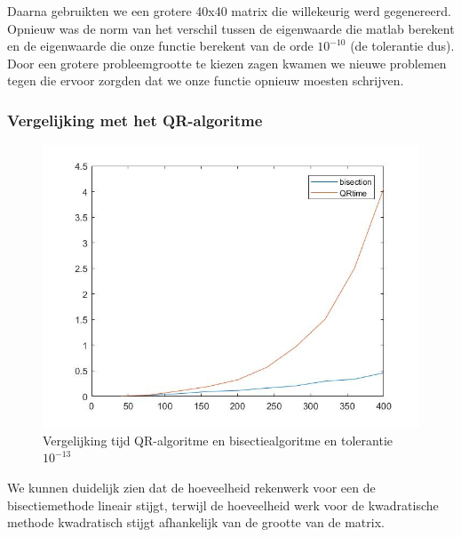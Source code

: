 \documentclass[a4paper]{article}
\begin{document}
Daarna gebruikten we een grotere 40x40 matrix die willekeurig werd gegenereerd. Opnieuw was de norm van het verschil tussen de eigenwaarde die matlab berekent en de eigenwaarde die onze functie berekent van de orde $10^{-10}$ (de tolerantie dus). Door een grotere probleemgrootte te kiezen zagen kwamen we nieuwe problemen tegen die ervoor zorgden dat we onze functie opnieuw moesten schrijven.
\subsubsection{Vergelijking met het QR-algoritme}
\begin{figure}
\caption{Vergelijking tijd QR-algoritme en bisectiealgoritme en tolerantie $10^{-13}$}
\includegraphics[width=\textwidth, height=0.3\textheight]{QRVSBIPOLAR.JPG}
\end{figure}
We kunnen duidelijk zien dat de hoeveelheid rekenwerk voor een de bisectiemethode lineair stijgt, terwijl de hoeveelheid werk voor de kwadratische methode kwadratisch stijgt afhankelijk van de grootte van de matrix.
\end{document}
